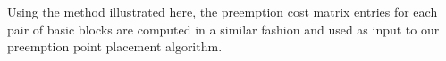\noindent
Using the method illustrated here, the preemption cost matrix entries for each pair of basic blocks are computed in a similar fashion and used as input to our preemption point placement algorithm.
%
%
%
%
%
%
